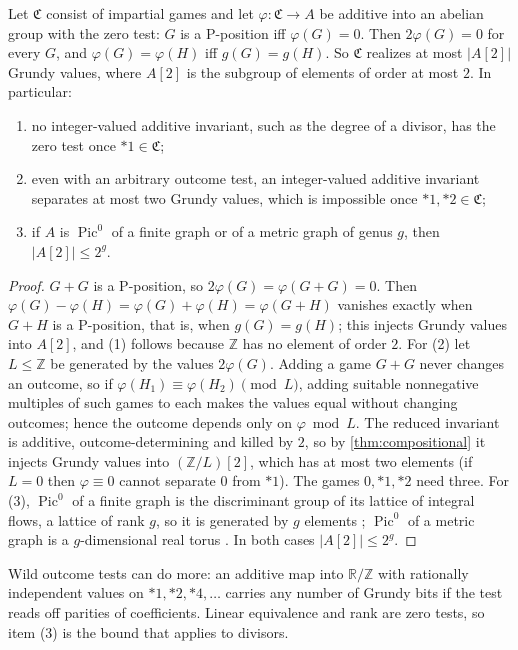 \documentclass[final]{siamart0516}
\numberwithin{theorem}{section}
\numberwithin{equation}{section}
\theoremstyle{siamnonum}
\theoremstyle{plain}
\newcommand{\ZZ}{\mathbb{Z}}
\newcommand{\RR}{\mathbb{R}}
\begin{document}
\begin{theorem}\label{thm:torsion}
Let $\mathfrak C$ consist of impartial games and let $\varphi\colon\mathfrak C\to A$ be additive into an abelian group with the zero test: $G$ is a P-position iff $\varphi(G)=0$. Then $2\varphi(G)=0$ for every $G$, and $\varphi(G)=\varphi(H)$ iff $g(G)=g(H)$. So $\mathfrak C$ realizes at most $|A[2]|$ Grundy values, where $A[2]$ is the subgroup of elements of order at most $2$. In particular:
\begin{enumerate}[label=\textup{(\arabic*)}]
\item no integer-valued additive invariant, such as the degree of a divisor, has the zero test once $*1\in\mathfrak C$;
\item even with an arbitrary outcome test, an integer-valued additive invariant separates at most two Grundy values, which is impossible once $*1,*2\in\mathfrak C$;
\item if $A$ is $\operatorname{Pic}^0$ of a finite graph or of a metric graph of genus $g$, then $|A[2]|\le 2^g$.
\end{enumerate}
\end{theorem}
\begin{proof}
$G+G$ is a P-position, so $2\varphi(G)=\varphi(G+G)=0$. Then $\varphi(G)-\varphi(H)=\varphi(G)+\varphi(H)=\varphi(G+H)$ vanishes exactly when $G+H$ is a P-position, that is, when $g(G)=g(H)$; this injects Grundy values into $A[2]$, and (1) follows because $\ZZ$ has no element of order $2$.
For (2) let $L\le\ZZ$ be generated by the values $2\varphi(G)$. Adding a game $G+G$ never changes an outcome, so if $\varphi(H_1)\equiv\varphi(H_2)\pmod L$, adding suitable nonnegative multiples of such games to each makes the values equal without changing outcomes; hence the outcome depends only on $\varphi\bmod L$. The reduced invariant is additive, outcome-determining and killed by $2$, so by \cref{thm:compositional} it injects Grundy values into $(\ZZ/L)[2]$, which has at most two elements (if $L=0$ then $\varphi\equiv0$ cannot separate $0$ from $*1$). The games $0,*1,*2$ need three.
For (3), $\operatorname{Pic}^0$ of a finite graph is the discriminant group of its lattice of integral flows, a lattice of rank $g$, so it is generated by $g$ elements \cite{BHN}; $\operatorname{Pic}^0$ of a metric graph is a $g$-dimensional real torus \cite{MikhalkinZharkov}. In both cases $|A[2]|\le 2^g$.
\end{proof}

Wild outcome tests can do more: an additive map into $\RR/\ZZ$ with rationally independent values on $*1,*2,*4,\dots$ carries any number of Grundy bits if the test reads off parities of coefficients. Linear equivalence and rank are zero tests, so item (3) is the bound that applies to divisors.
\end{document}
